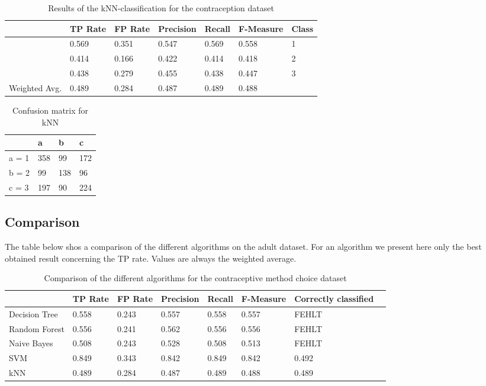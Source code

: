 \documentclass[paper=a4, fontsize=11pt]{scrartcl} %
\numberwithin{equation}{section} %
\numberwithin{figure}{section} %
\numberwithin{table}{section} %
\begin{document}
\begin{table}[h]
\centering
\begin{tabular}{lllllll}
	\toprule
	&								TP Rate   	&FP Rate   &Precision   &Recall  &F-Measure     	&Class\\
	\midrule
									&0.569     	&0.351     &0.547     	&0.569   &0.558      	     	&1\\
                 	&0.414     	&0.166     &0.422     	&0.414   &0.418      	    	&2\\
                 	&0.438     	&0.279     &0.455     	&0.438   &0.447      	    	&3\\

	Weighted Avg.   &0.489     	&0.284     &0.487     	&0.489   &0.488      				&\\
	\bottomrule
\end{tabular}
\caption{Results of the kNN-classification for the contraception dataset}
\end{table}

\vspace{6pt}

\begin{table}[h]
\centering
\begin{tabular}{|l|lll|}
	\hline
	      &a   &b   &c \\
	\hline
    a = 1 &358 &99  &172\\
    b = 2 &99  &138 &96 \\
 	c = 3 &197 &90  &224 \\
  \hline
\end{tabular}
\caption{Confusion matrix for kNN}
\end{table}

\subsection{Comparison}

The table below shos a comparison of the different algorithms on the adult dataset. For an algorithm we present here only the best obtained result concerning the TP rate. Values are always the weighted average.

\begin{table}[h]
\centering
\begin{tabular}{llllllll}
	\toprule
									&TP Rate   	&FP Rate   &Precision &Recall  &F-Measure   &  Correctly classified\\
	\midrule
	Decision Tree 	&  0.558   & 0.243   & 0.557     	& 0.558  & 0.557     & FEHLT\\
  Random Forest		&  0.556   & 0.241   & 0.562     	& 0.556  & 0.556     & FEHLT\\
  Naive Bayes		 	&  0.508   & 0.243   & 0.528     	& 0.508  & 0.513     & FEHLT\\
  SVM							& 0.849    & 0.343   &0.842   		& 0.849  & 0.842 		 & 0.492\\
  kNN							&0.489     &0.284    &0.487     	& 0.489  & 0.488 		 & 0.489\\
	\bottomrule
\end{tabular}
\caption{Comparison of the different algorithms for the contraceptive method choice dataset}
\end{table}

\end{document}
